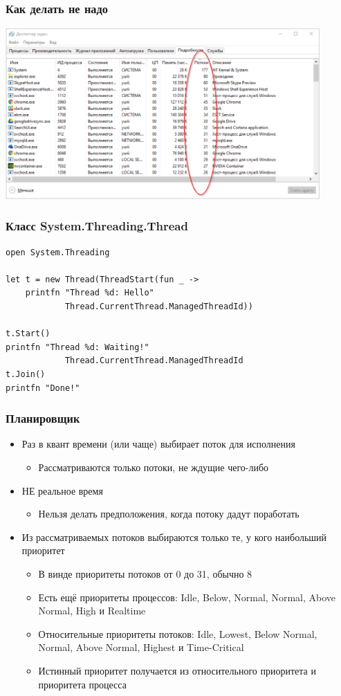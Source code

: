 \documentclass[xetex,mathserif,serif]{beamer}
\begin{document}
	\begin{frame}
		\frametitle{Как делать не надо}
		\begin{center}
			\includegraphics[width=0.9\textwidth]{threadsEverywhere.png}
		\end{center}
	\end{frame}

	\begin{frame}[fragile]
		\frametitle{Класс System.Threading.Thread}
		\begin{verbatim}
open System.Threading

let t = new Thread(ThreadStart(fun _ ->
    printfn "Thread %d: Hello" 
            Thread.CurrentThread.ManagedThreadId))

t.Start()
printfn "Thread %d: Waiting!" 
            Thread.CurrentThread.ManagedThreadId
t.Join()
printfn "Done!"
		\end{verbatim}
	\end{frame}

	\begin{frame}
		\frametitle{Планировщик}
		\begin{itemize}
			\item Раз в квант времени (или чаще) выбирает поток для исполнения
			\begin{itemize}
				\item Рассматриваются только потоки, не ждущие чего-либо
			\end{itemize}
			\item НЕ реальное время
			\begin{itemize}
				\item Нельзя делать предположения, когда потоку дадут поработать
			\end{itemize}
			\item Из рассматриваемых потоков выбираются только те, у кого наибольший приоритет
			\begin{itemize}
				\item В винде приоритеты потоков от 0 до 31, обычно 8
				\item Есть ещё приоритеты процессов: Idle, Below, Normal, Normal, Above Normal, High и Realtime
				\item Относительные приоритеты потоков: Idle, Lowest, Below Normal, Normal, Above Normal, Highest и Time-Critical
				\item Истинный приоритет получается из относительного приоритета и приоритета процесса
			\end{itemize}
		\end{itemize}
	\end{frame}
\end{document}

